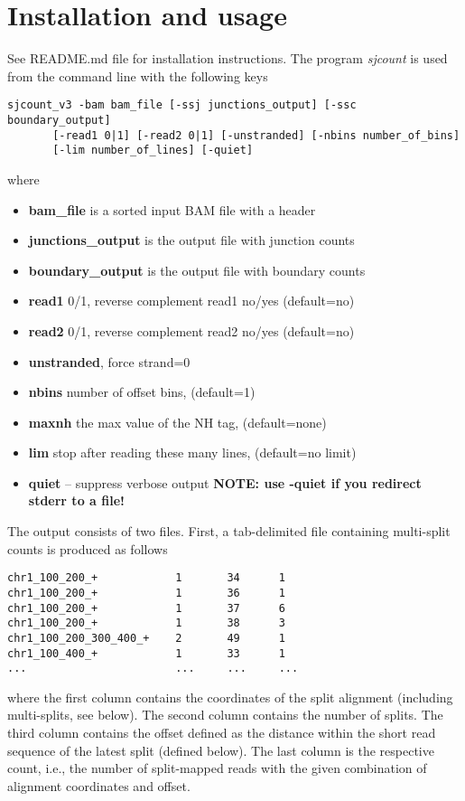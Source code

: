 \documentclass{article}
\begin{document}
\section{Installation and usage}
See README.md file for installation instructions. The program {\em sjcount} is used from the command line with the following keys
\begin{verbatim}
sjcount_v3 -bam bam_file [-ssj junctions_output] [-ssc boundary_output]
       [-read1 0|1] [-read2 0|1] [-unstranded] [-nbins number_of_bins]
       [-lim number_of_lines] [-quiet]
\end{verbatim}
where
\begin{itemize}
\item {\bf bam\_file} is a sorted input BAM file with a header
\item {\bf junctions\_output} is the output file with junction counts
\item {\bf boundary\_output} is the output file with boundary counts
\item {\bf read1} 0/1, reverse complement read1 no/yes (default=no)
\item {\bf read2} 0/1, reverse complement read2 no/yes (default=no)
\item {\bf unstranded}, force strand=0
\item {\bf nbins} number of offset bins, (default=1)
\item {\bf maxnh} the max value of the NH tag, (default=none)
\item {\bf lim} stop after reading these many lines, (default=no limit)
\item {\bf quiet} -- suppress verbose output {\bf NOTE: use -quiet if you redirect stderr to a file!}
\end{itemize}

The output consists of two files. First, a tab-delimited file containing multi-split counts is produced as follows
\begin{verbatim}
chr1_100_200_+            1       34      1
chr1_100_200_+            1       36      1
chr1_100_200_+            1       37      6
chr1_100_200_+            1       38      3
chr1_100_200_300_400_+    2       49      1
chr1_100_400_+            1       33      1
...                       ...     ...     ...
\end{verbatim}
where the first column contains the coordinates of the split alignment (including multi-splits, see below). The second 
column contains the number of splits. The third column contains the offset defined as the distance within the short read 
sequence of the latest split (defined below). The last column is the respective count, i.e., the number of split-mapped 
reads with the given combination of alignment coordinates and offset. 
\end{document}
